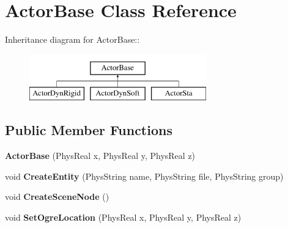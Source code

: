 \hypertarget{classActorBase}{
\section{ActorBase Class Reference}
\label{dd/d7b/classActorBase}
}
Inheritance diagram for ActorBase::\begin{figure}[H]
\begin{center}
\leavevmode
\includegraphics[height=2cm]{dd/d7b/classActorBase}
\end{center}
\end{figure}
\subsection*{Public Member Functions}
\begin{DoxyCompactItemize}
\item 
\hypertarget{classActorBase_a043800519c16444c794f64eb3488a7d2}{
{\bfseries ActorBase} (PhysReal x, PhysReal y, PhysReal z)}
\label{dd/d7b/classActorBase_a043800519c16444c794f64eb3488a7d2}

\item 
\hypertarget{classActorBase_aa87583c47b8653e8ac7d96f1481b57fd}{
void {\bfseries CreateEntity} (PhysString name, PhysString file, PhysString group)}
\label{dd/d7b/classActorBase_aa87583c47b8653e8ac7d96f1481b57fd}

\item 
\hypertarget{classActorBase_a168cd57e20b2adfc5cae21627ddbae31}{
void {\bfseries CreateSceneNode} ()}
\label{dd/d7b/classActorBase_a168cd57e20b2adfc5cae21627ddbae31}

\item 
\hypertarget{classActorBase_a624f83ed4265a32db6d816a882a5bebd}{
void {\bfseries SetOgreLocation} (PhysReal x, PhysReal y, PhysReal z)}
\label{dd/d7b/classActorBase_a624f83ed4265a32db6d816a882a5bebd}

\end{DoxyCompactItemize}
